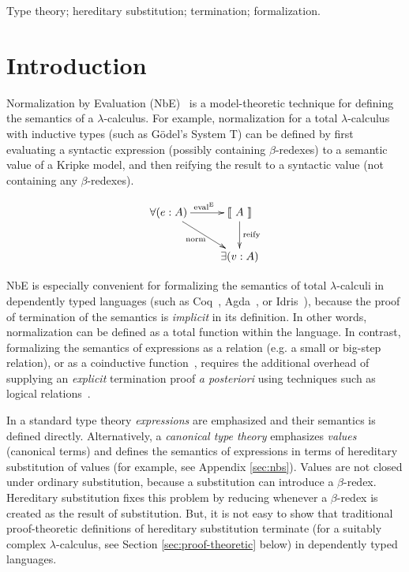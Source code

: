 \documentclass{llncs}
\newcommand{\refapp}[1]{Appendix \ref{sec:#1}}
\newcommand{\refsec}[1]{Section \ref{sec:#1}}
\def\eval{\fun{eval}^\con{E}}
\newcommand{\els}[1]{\llbracket ~ #1 ~ \rrbracket}
\newcommand{\con}[1]{\textmd{#1}}
\newcommand{\fun}[1]{\textmd{#1}}
\begin{document}
\keywords
Type theory; hereditary substitution; termination; formalization.

\section{Introduction}
\label{sec:intro}

Normalization by Evaluation (NbE)~\cite{TODO} is a model-theoretic
technique for defining the semantics of a $\lambda$-calculus. For
example, normalization for a total $\lambda$-calculus with inductive
types (such as G{\"o}del's System T) can be defined by first
evaluating a syntactic expression (possibly containing $\beta$-redexes) to a
semantic value of a Kripke model, and then reifying the result to a syntactic value
(not containing any $\beta$-redexes).

\begin{displaymath}
    \xymatrix{
          {\forall (e : A)} 
          \ar[dr]_{\fun{norm}}
          \ar[r]^{\eval}
        & {\els{A}}
          \ar[d]^{\large{\fun{reify}}}
\\      & \exists (v : A) }
\end{displaymath}

NbE is especially convenient for formalizing the semantics of total
$\lambda$-calculi in dependently typed languages (such as
Coq~\cite{TODO}, Agda~\cite{TODO}, or Idris~\cite{TODO}), because the
proof of termination of the semantics is \textit{implicit} in its
definition. In other words, normalization can be defined as a total
function within the language.
In contrast, formalizing the semantics of expressions as a
relation (e.g. a small or big-step relation), or as a
coinductive function~\cite{TODO}, requires the additional overhead
of supplying an \textit{explicit}
termination proof \textit{a posteriori} using techniques such as
logical relations~\cite{TODO}.

In a standard type theory \textit{expressions} are emphasized and
their semantics is defined directly. Alternatively, a
\textit{canonical type theory} emphasizes \textit{values} (canonical terms) and defines
the semantics of expressions in terms of hereditary substitution of
values (for example, see \refapp{nbs}). 
Values are not closed under ordinary substitution, because a
substitution can introduce a $\beta$-redex. Hereditary substitution
fixes this problem by reducing whenever a $\beta$-redex is created as
the result of substitution. But, it is not easy to show that
traditional proof-theoretic definitions of hereditary substitution 
terminate (for a suitably complex $\lambda$-calculus, see
\refsec{proof-theoretic} below)
in dependently typed languages.
\end{document}
